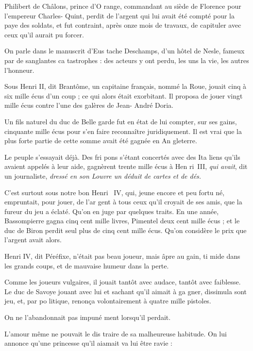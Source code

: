 Philibert de Châlons, prince d'O%
range, commandant au siède de
Florence pour l'empereur Charles-%
Quint, perdit de l'argent qui lui avait
été compté pour la paye des soldats,
et fut contraint, après onze mois de
travaux, de capituler avec ceux qu'il
aurait pu forcer.

On parle dans le manuscrit d'Eus%
tache Deschamps, d'un hôtel de
Nesle, fameux par de sanglantes ca%
tastrophes : des acteurs y ont perdu,
les uns la vie, les autres l'honneur.

Sous Henri II, dit Brantôme, un
capitaine français, nommé la Roue,
jouait cinq à six mille écus d'un
coup ; ce qui alors était exorbitant.
Il proposa de jouer vingt mille écus
contre l'une des galères de Jean-%
André Doria.

Un fils naturel du duc de Belle%
garde fut en état de lui compter, sur
ses gains, cinquante mille écus pour
s'en faire reconnaître juridiquement.
Il est vrai que la plus forte partie de
cette somme avait été gagnée en An%
gleterre.

Le peuple s'essayait déjà. Des fri%
pons s'étant concertés avec des Ita%
liens qu'ils avaient appelés à leur aide,
gagnèrent trente mille écus à Hen%
ri~III, \emph{qui avait}, dit un journaliste,
\emph{dressé en son Louvre un déduit de
cartes et de dés.}

C'est surtout sous notre bon Henri~
IV, qui, jeune encore et peu fortu%
né, empruntait, pour jouer, de l'ar%
gent à tous ceux qu'il croyait de ses
amis, que la fureur du jeu a éclaté.
Qu'on en juge par quelques traits. En
une année, Bassompierre gagna cinq
cent mille livres, Pimentel deux cent
mille écus ; et le duc de Biron perdit
seul plus de cinq cent mille écus.
Qu'on considère le prix que l'argent
avait alors.

Henri IV, dit Péréfixe, n'était pas
beau joueur, mais âpre au gain, ti%
mide dans les grands coups, et de
mauvaise humeur dans la perte.

Comme les joueurs vulgaires, il
jouait tantôt avec audace, tantôt avec
faiblesse. Le duc de Savoye jouant
avec lui et sachant qu'il aimait à ga%
gner, dissimula sont jeu, et, par po%
litique, renonça volontairement à
quatre mille pistoles.

On ne l'abandonnait pas impuné%
ment lorsqu'il perdait.

L'amour même ne pouvait le dis%
traire de sa malheureuse habitude.
On lui annonce qu'une princesse
qu'il aiamait va lui être ravie : 

